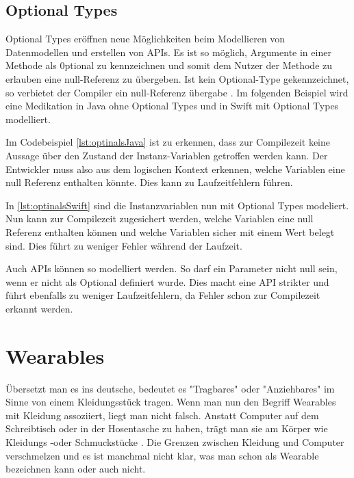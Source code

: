 \subsection{Optional Types}
\label{ch:optionals}
Optional Types eröffnen neue Möglichkeiten beim Modellieren von Datenmodellen und erstellen von APIs. Es ist so möglich, Argumente in einer Methode als 0ptional zu kennzeichnen und somit dem Nutzer der Methode zu erlauben eine null-Referenz zu übergeben. Ist kein Optional-Type gekennzeichnet, so verbietet der Compiler ein null-Referenz übergabe \cite{Apple:2014sp}. Im folgenden Beispiel wird eine Medikation in Java ohne Optional Types und in Swift mit Optional Types modelliert.
 

Im Codebeispiel \ref{lst:optinalsJava} ist zu erkennen, dass zur Compilezeit keine Aussage über den Zustand der Instanz-Variablen getroffen werden kann. Der Entwickler muss also aus dem logischen Kontext erkennen, welche Variablen eine null Referenz enthalten könnte. Dies kann zu Laufzeitfehlern führen.


In \ref{lst:optinalsSwift} sind die Instanzvariablen nun mit Optional Types modeliert. Nun 
kann zur Compilezeit zugesichert werden, welche Variablen eine null Referenz enthalten können und welche Variablen sicher mit einem Wert belegt sind. Dies führt zu weniger Fehler während der Laufzeit.

Auch APIs können so modelliert werden. So darf ein Parameter nicht null sein, wenn er nicht als Optional definiert wurde. Dies macht eine API strikter und führt ebenfalls zu weniger Laufzeitfehlern, da Fehler schon zur Compilezeit erkannt werden.

\section{Wearables}
Übersetzt man es ins deutsche, bedeutet es "Tragbares" oder "Anziehbares" im Sinne von einem Kleidungsstück tragen. Wenn man nun den Begriff Wearables mit Kleidung assoziiert, liegt man nicht falsch. Anstatt Computer auf dem Schreibtisch oder in der Hosentasche zu haben, trägt man sie am Körper wie Kleidungs -oder Schmuckstücke \cite{Dvorak:2008aa}. Die Grenzen zwischen Kleidung und Computer verschmelzen und es ist manchmal nicht klar, was man schon als Wearable bezeichnen kann oder auch nicht.

